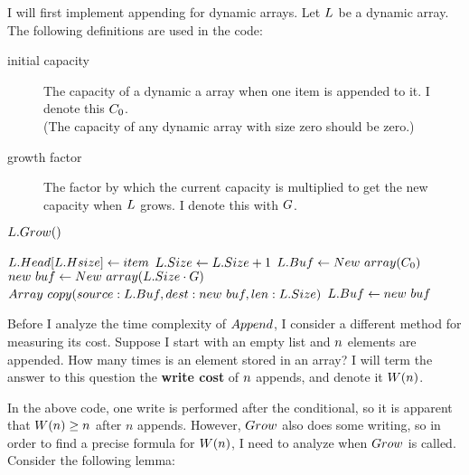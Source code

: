 \HdrDynArrayImpl

I will first implement appending for dynamic arrays. Let $L$ be a dynamic array. The following definitions are used in the code:

\begin{description}
	\item[initial capacity] The capacity of a dynamic a array when one item is appended to it. I denote this $C_0$.\\
	(The capacity of any dynamic array with size zero should be zero.)
	\item[growth factor] The factor by which the current capacity is multiplied to get the new capacity when $L$ grows. I denote this with $G$.
\end{description}

\begin{algorithm}
	\begin{algorithmic}[1]
				\State $L.Grow()$
			\EndIf
			
			\State $L.Head[L.Hsize] \gets item$
			\State $L.Size \gets L.Size + 1$
		\EndProcedure
		\Statex
				\State $L.Buf \gets New\ array(C_0)$
			\Else
				\State $new\ buf \gets New\ array(L.Size \cdot G)$
				\State $Array\ copy(source: L.Buf, dest: new\ buf, len: L.Size)$
				\State $L.Buf \gets new\ buf$
			\EndIf
		\EndProcedure
	\end{algorithmic}
\end{algorithm}

\HdrTimeComplex

Before I analyze the time complexity of $Append$, I consider a different method for measuring its cost. Suppose I start with an empty list and $n$ elements are appended. How many times is an element stored in an array? I will term the answer to this question the \textbf{write cost} of $n$ appends, and denote it $W(n)$.

In the above code, one write is performed after the conditional, so it is apparent that $W(n) \geq n$ after $n$ appends. However, $Grow$ also does some writing, so in order to find a precise formula for $W(n)$, I need to analyze when $Grow$ is called. Consider the following lemma:

